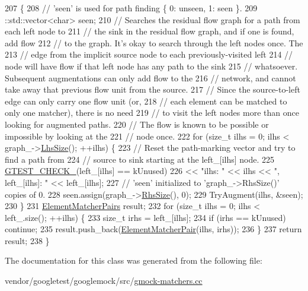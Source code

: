 \begin{DoxyCode}
207                                 \{
208     \textcolor{comment}{// 'seen' is used for path finding \{ 0: unseen, 1: seen \}.}
209     ::std::vector<char> seen;
210     \textcolor{comment}{// Searches the residual flow graph for a path from each left node to}
211     \textcolor{comment}{// the sink in the residual flow graph, and if one is found, add flow}
212     \textcolor{comment}{// to the graph. It's okay to search through the left nodes once. The}
213     \textcolor{comment}{// edge from the implicit source node to each previously-visited left}
214     \textcolor{comment}{// node will have flow if that left node has any path to the sink}
215     \textcolor{comment}{// whatsoever. Subsequent augmentations can only add flow to the}
216     \textcolor{comment}{// network, and cannot take away that previous flow unit from the source.}
217     \textcolor{comment}{// Since the source-to-left edge can only carry one flow unit (or,}
218     \textcolor{comment}{// each element can be matched to only one matcher), there is no need}
219     \textcolor{comment}{// to visit the left nodes more than once looking for augmented paths.}
220     \textcolor{comment}{// The flow is known to be possible or impossible by looking at the}
221     \textcolor{comment}{// node once.}
222     \textcolor{keywordflow}{for} (\textcolor{keywordtype}{size\_t} ilhs = 0; ilhs < graph\_->\hyperlink{classtesting_1_1internal_1_1MatchMatrix_ab98f3aa7fd9a536329e495a5016f8d63}{LhsSize}(); ++ilhs) \{
223       \textcolor{comment}{// Reset the path-marking vector and try to find a path from}
224       \textcolor{comment}{// source to sink starting at the left\_[ilhs] node.}
225       \hyperlink{gtest-port_8h_ab54343f0a36dc4cb0ce8a478dd7847b8}{GTEST\_CHECK\_}(left\_[ilhs] == kUnused)
226           << \textcolor{stringliteral}{"ilhs: "} << ilhs << \textcolor{stringliteral}{", left\_[ilhs]: "} << left\_[ilhs];
227       \textcolor{comment}{// 'seen' initialized to 'graph\_->RhsSize()' copies of 0.}
228       seen.assign(graph\_->\hyperlink{classtesting_1_1internal_1_1MatchMatrix_a5292e007b3d54e2d89e38fa2a9c4e9d9}{RhsSize}(), 0);
229       TryAugment(ilhs, &seen);
230     \}
231     \hyperlink{namespacetesting_1_1internal_a0038618710c01a71150887dc7cfb0a29}{ElementMatcherPairs} result;
232     \textcolor{keywordflow}{for} (\textcolor{keywordtype}{size\_t} ilhs = 0; ilhs < left\_.size(); ++ilhs) \{
233       \textcolor{keywordtype}{size\_t} irhs = left\_[ilhs];
234       \textcolor{keywordflow}{if} (irhs == kUnused) \textcolor{keywordflow}{continue};
235       result.push\_back(\hyperlink{namespacetesting_1_1internal_a109863545f08651178bf0f520aebd33b}{ElementMatcherPair}(ilhs, irhs));
236     \}
237     \textcolor{keywordflow}{return} result;
238   \}
\end{DoxyCode}


The documentation for this class was generated from the following file\+:\begin{DoxyCompactItemize}
\item 
vendor/googletest/googlemock/src/\hyperlink{gmock-matchers_8cc}{gmock-\/matchers.\+cc}\end{DoxyCompactItemize}
